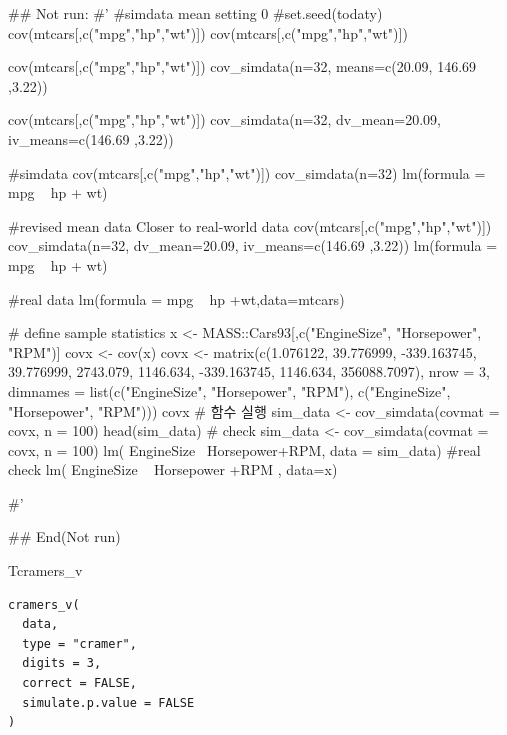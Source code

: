 \documentclass[a4paper]{book}
\begin{document}
%
\begin{Examples}
\begin{ExampleCode}

\#\# Not run: 
#'
#simdata mean setting 0
#set.seed(todaty)
cov(mtcars[,c("mpg","hp","wt")]) %
cov(mtcars[,c("mpg","hp","wt")]) %

cov(mtcars[,c("mpg","hp","wt")]) %
  cov_simdata(n=32, means=c(20.09, 146.69 ,3.22))

cov(mtcars[,c("mpg","hp","wt")]) %
  cov_simdata(n=32, dv_mean=20.09, iv_means=c(146.69 ,3.22))

#simdata
cov(mtcars[,c("mpg","hp","wt")]) %
  cov_simdata(n=32) %
  lm(formula = mpg ~ hp + wt)%

#revised mean data Closer to real-world data
cov(mtcars[,c("mpg","hp","wt")]) %
  cov_simdata(n=32, dv_mean=20.09, iv_means=c(146.69 ,3.22)) %
  lm(formula = mpg ~ hp + wt)%


#real data
lm(formula = mpg ~ hp +wt,data=mtcars)%



# define sample statistics
x <- MASS::Cars93[,c("EngineSize", "Horsepower", "RPM")]
covx <- cov(x)
covx <- matrix(c(1.076122, 39.776999, -339.163745,
                 39.776999, 2743.079, 1146.634,
                 -339.163745, 1146.634, 356088.7097), nrow = 3,
               dimnames = list(c("EngineSize", "Horsepower", "RPM"),
                               c("EngineSize", "Horsepower", "RPM")))
covx
# 함수 실행
sim_data <- cov_simdata(covmat = covx, n = 100)
head(sim_data)
# check
sim_data <- cov_simdata(covmat = covx, n = 100)
lm( EngineSize~ Horsepower+RPM, data = sim_data) %
#real check
lm( EngineSize ~ Horsepower +RPM , data=x)%



#'

## End(Not run)
\end{ExampleCode}
\end{Examples}
%
\begin{Description}
Tcramers\_v
\end{Description}
%
\begin{Usage}
\begin{verbatim}
cramers_v(
  data,
  type = "cramer",
  digits = 3,
  correct = FALSE,
  simulate.p.value = FALSE
)
\end{verbatim}
\end{Usage}
\end{document}
